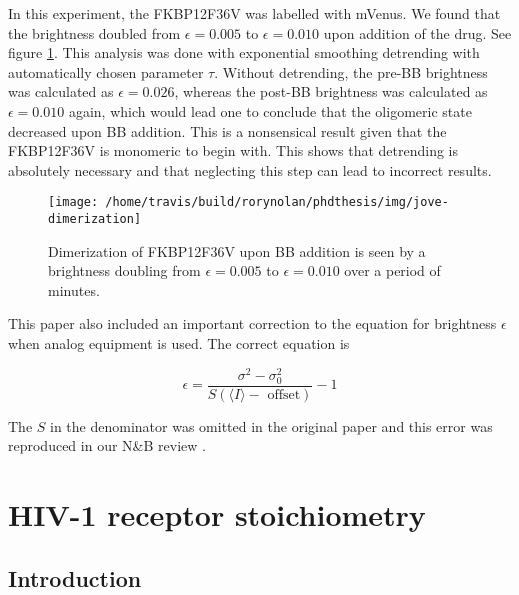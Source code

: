 \documentclass[12pt,]{book}
\theoremstyle{definition}
\theoremstyle{definition}
\theoremstyle{definition}
\theoremstyle{remark}
\let\BeginKnitrBlock\begin \let\EndKnitrBlock\end
\begin{document}
In this experiment, the FKBP12F36V was labelled with mVenus. We found
that the brightness doubled from \(\epsilon = 0.005\) to
\(\epsilon = 0.010\) upon addition of the drug. See figure
\ref{fig:jove}. This analysis was done with exponential smoothing
detrending with automatically chosen parameter \(\tau\). Without
detrending, the pre-BB brightness was calculated as
\(\epsilon = 0.026\), whereas the post-BB brightness was calculated as
\(\epsilon = 0.010\) again, which would lead one to conclude that the
oligomeric state decreased upon BB addition. This is a nonsensical
result given that the FKBP12F36V is monomeric to begin with. This shows
that detrending is absolutely necessary and that neglecting this step
can lead to incorrect results.





\begin{figure}

\texttt{[image: /home/travis/build/rorynolan/phdthesis/img/jove-dimerization]} \hfill{}

\caption{Dimerization of FKBP12F36V upon BB addition is seen
by a brightness doubling from \(\epsilon = 0.005\) to
\(\epsilon = 0.010\) over a period of minutes.}\label{fig:jove}
\end{figure}

\BeginKnitrBlock{remark}
\iffalse{} {Remark. } \fi{} This paper also included an important
correction to the equation for brightness \(\epsilon\) when analog
equipment is used. The correct equation is

\begin{equation}
\epsilon = \frac{\sigma^2 - \sigma_0^2}{S(\langle I \rangle - \text{ offset})} - 1
\label{eq:dalaleq}
\end{equation}

The \(S\) in the denominator was omitted in the original paper
\citep{Dalal} and this error was reproduced in our N\&B review
\citep{NBreview}.
\EndKnitrBlock{remark}

\section{HIV-1 receptor
stoichiometry}\label{hiv-1-receptor-stoichiometry}

\subsection{Introduction}\label{introduction-2}
\end{document}
